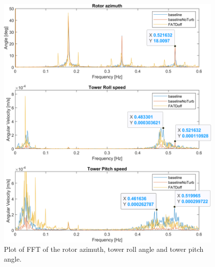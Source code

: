 \begin{figure}[h]
	\centering
	\includegraphics[width=0.8\linewidth]{Graphics/TestResults/tj01/PSIxVelyVelFFT.png}
	\caption{Plot of FFT of the rotor azimuth, tower roll angle and tower pitch angle.}
	\label{fig:tj1_PSIxVelyVelFFT}
\end{figure}
